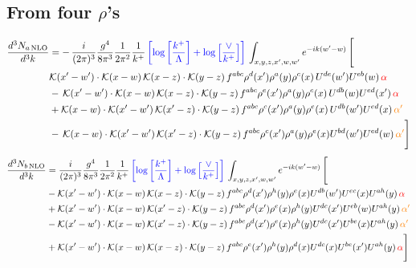 \documentclass[9pt]{article}
\numberwithin{equation}{section}
\begin{document}
\subsection{From four $\rho$'s}
\begin{align}
    \frac{d^{3}N_{a\,\rm NLO}}{d^{3}k} & = -\,\frac{i}{(2\pi)^{3}}\frac{g^{4}}{8\pi^{3}}\frac{1}{2\pi^{2}} \frac{1}{k^{+}}\,{\color{blue}\left[\log{\left[\frac{k^{+}}{\Lambda}\right]}+\log{\left[\frac{\vee}{k^{+}}\right]}\right]}\,\int_{x,y,z,x^{\prime},w,w^{\prime}}e^{-ik(w^{\prime}-w)}\, \Bigg[\notag \\ &  \mathcal{K}(x'-w')\cdot \mathcal{K}(x-w)\, \mathcal{K}(x-z)\cdot \mathcal{K}(y-z)\, f^{a b c} \rho^{d}(x') \rho^{a}(y) \rho^{c}(x)\,U^{d e}(w') U^{e b}(w)\, {\color{red} \alpha} \nonumber\\
    &  -\,\mathcal{K}(x'-w')\cdot \mathcal{K}(x-w)\, \mathcal{K}(x-z)\cdot \mathcal{K}(y-z)\, f^{a b c} \rho^{e}(x') \rho^{a}(y) \rho^{c}(x)\, U^{d b}(w) U^{e d}(x')\, {\color{red} \alpha}\nonumber\\
    & + \mathcal{K}(x-w)\cdot \mathcal{K}(x'-w')\, \mathcal{K}(x'-z)\cdot \mathcal{K}(y-z)\, f^{a b c} \rho^{c}(x') \rho^{a}(y) \rho^{e}(x)\,U^{d b}(w') U^{e d}(x)\, {\color{orange} \alpha'} \nonumber\\
    & -\,\mathcal{K}(x-w)\cdot \mathcal{K}(x'-w')\, \mathcal{K}(x'-z)\cdot \mathcal{K}(y-z)\, f^{a b c} \rho^{c}(x') \rho^{a}(y) \rho^{e}(x) U^{b d}(w') U^{e d}(w)\, {\color{orange} \alpha'}\Bigg]
\end{align}
\begin{align}
      \frac{d^{3}N_{b\,\rm NLO}}{d^{3}k} & = \frac{i}{(2\pi)^{3}}\frac{g^{4}}{8\pi^{3}}\frac{1}{2\pi^{2}} \frac{1}{k^{+}}\,{\color{blue}\left[\log{\left[\frac{k^{+}}{\Lambda}\right]}+\log{\left[\frac{\vee}{k^{+}}\right]}\right]}\,\int_{x,y,z,x^{\prime},w,w^{\prime}}e^{-ik(w^{\prime}-w)}\, \Bigg[\notag \\ & - \mathcal{K}(x'-w')\cdot \mathcal{K}(x-w)\, \mathcal{K}(x-z)\cdot \mathcal{K}(y-z)\, f^{a b c} \rho^{d}(x') \rho^{h}(y) \rho^{e}(x) U^{d b}(w') U^{e c}(x) U^{a h}(y)\, {\color{red} \alpha}\nonumber\\
    &+ \mathcal{K}(x'-w')\cdot \mathcal{K}(x-w)\,\mathcal{K}(x'-z)\cdot \mathcal{K}(y-z)\, f^{a b c} \rho^{d}(x') \rho^{e}(x) \rho^{h}(y) U^{d c}(x') U^{e b}(w) U^{a h}(y)\, {\color{orange} \alpha'}\nonumber\\
    &- \mathcal{K}(x'-w')\cdot \mathcal{K}(x-w)\,\mathcal{K}(x'-z)\cdot \mathcal{K}(y-z)\, f^{a b c} \rho^{d}(x') \rho^{e}(x) \rho^{h}(y) U^{d c}(x') U^{b e}(x) U^{a h}(y)\, {\color{orange} \alpha'}\nonumber\\
    &+  \mathcal{K}(x'-w')\cdot \mathcal{K}(x-w)\, \mathcal{K}(x-z)\cdot \mathcal{K}(y-z)\, f^{a b c} \rho^{e}(x') \rho^{h}(y) \rho^{d}(x) U^{d c}(x) U^{b e}(x') U^{a h}(y)\, {\color{red} \alpha} \Bigg]
\end{align}
\end{document}
